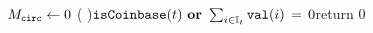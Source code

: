 %
%
\renewcommand{\LinesNumbered}{%
	\setboolean{algocf@linesnumbered}{true}%
	\renewcommand{\algocf@linesnumbered}{\everypar={\nl}}}%

\let\oldnl\nl%
\newcommand{\nonl}{\renewcommand{\nl}{\let\nl\oldnl}}%

\ifdefined\varInputAlgos%
\renewcommand{\arraystretch}{1.90}%
\begin{algorithm*}[!h]%
	\DontPrintSemicolon
	\caption{$GetMCirc$: Measure $\protect\MCirc$ for given transaction $t$, $\typett$ \acs*{wbaType} within window $\wndw$.%
	}\label{algo:code_mcirc}%
	${M_{\mathtt{circ}}} \gets {0}$                                                                        %
	\lIf(                                                                                     ){${\mathtt{isCoinbase}}(t)\ {\mathbf{or}}\ \sum_{i\in{}{\mathbb{I}}_{t}} {\mathtt{val}}(i)\,=\,0$}{return $0$}%


\end{algorithm*}
